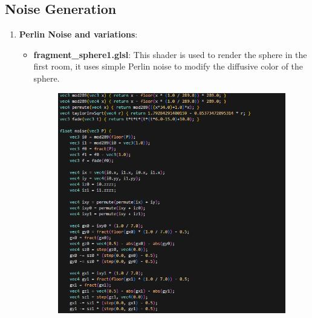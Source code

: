 \documentclass[12pt]{article}
\begin{document}
\subsection{Noise Generation}
\label{sec:noiseGeneration}

\begin{enumerate}
    \item \textbf{Perlin Noise and variations}:
    \begin{itemize}
        \item \textbf{fragment\_sphere1.glsl}:
        \newline
        This shader is used to render the sphere in the first room, it uses simple Perlin noise to modify the diffusive color of the sphere.

        \begin{figure}[H]
            \label{img:noiseFunction}
            \centering
            \includegraphics[width=1\textwidth]{Images/sphere1code.png}
        \end{figure}


\end{itemize}
\end{enumerate}
\end{document}
